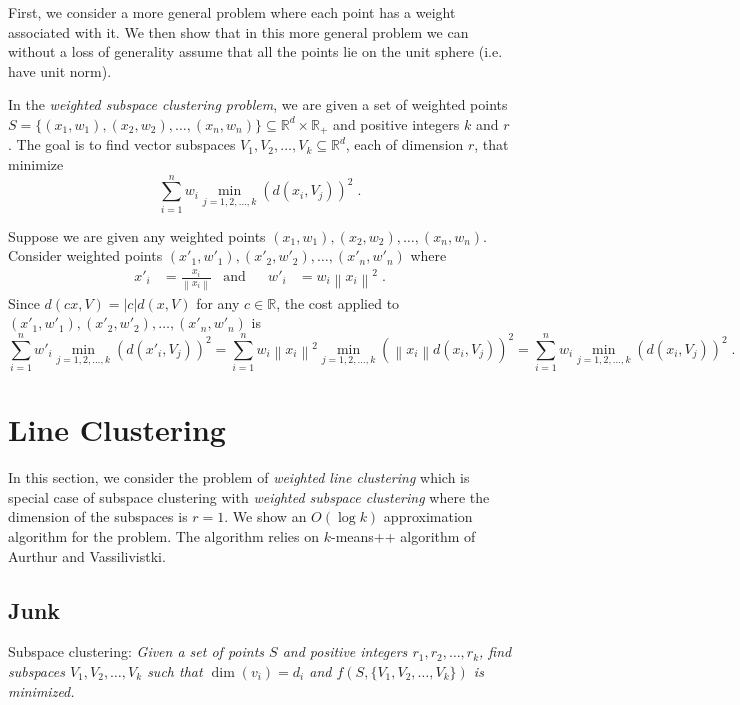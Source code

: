 \documentclass{article}
\newcommand{\R}{\mathbb{R}}
\newcommand{\norm}[1]{\left\|#1\right\|}
\begin{document}
First, we consider a more general problem where each point has a weight
associated with it. We then show that in this more general problem we can
without a loss of generality assume that all the points lie on the unit sphere
(i.e. have unit norm).

In the \emph{weighted subspace clustering problem},
we are given a set of weighted points $S = \{ (x_1, w_1), (x_2,w_2), \dots, (x_n, w_n) \} \subseteq \R^d \times \R_+$
and positive integers $k$ and $r$. The goal is to find vector subspaces $V_1, V_2, \dots, V_k \subseteq \R^d$,
each of dimension $r$, that minimize
\begin{equation}
\label{equation:weighted-cost-function}
\sum_{i=1}^n w_i \min_{j=1,2,\dots,k} \left(d(x_i, V_j)\right)^2 \; .
\end{equation}

Suppose we are given any weighted points $(x_1, w_1), (x_2, w_2), \dots, (x_n, w_n)$.
Consider weighted points $(x'_1, w'_1), (x'_2, w'_2), \dots, (x'_n, w'_n)$ where
\begin{align*}
x'_i & = \frac{x_i}{\norm{x_i}} & \text{and} &&
w'_i & = w_i \norm{x_i}^2 \; .
\end{align*}
Since $d(c x, V) = |c| d(x,V)$ for any $c \in \R$,
the cost \label{equation:weighted-cost-function} applied
to $(x'_1, w'_1), (x'_2, w'_2), \dots, (x'_n, w'_n)$ is
$$
\sum_{i=1}^n w'_i \min_{j=1,2,\dots,k} \left(d(x'_i, V_j)\right)^2
= \sum_{i=1}^n w_i \norm{x_i}^2 \min_{j=1,2,\dots,k} \left( \norm{x_i} d(x_i, V_j) \right)^2
= \sum_{i=1}^n w_i \min_{j=1,2,\dots,k} \left( d(x_i, V_j) \right)^2 \; .
$$

\section{Line Clustering}

In this section, we consider the problem of \emph{weighted line clustering}
which is special case of subspace clustering with \emph{weighted subspace
clustering} where the dimension of the subspaces is $r=1$.
We show an $O(\log k)$ approximation algorithm for the problem.
The algorithm relies on $k$-means++ algorithm of Aurthur and Vassilivistki.

\subsection{Junk}

Subspace clustering: \emph{Given a set of points $S$ and positive integers
$r_1, r_2, \dots, r_k$, find subspaces $V_1, V_2, \dots, V_k$ such that
$\dim(v_i) = d_i$ and $f(S, \{V_1, V_2, \dots, V_k\})$ is minimized.}
\end{document}
